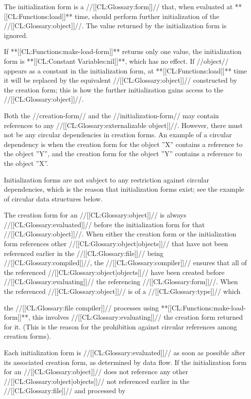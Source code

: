 The initialization form is a //[[CL:Glossary:form]]// that, when evaluated at **[[CL:Functions:load]]** time, should perform further initialization of the //[[CL:Glossary:object]]//. The value returned by the initialization form is ignored.

If **[[CL:Functions:make-load-form]]** returns only one value, the initialization form is **[[CL:Constant Variables:nil]]**, which has no effect. If //object// appears as a constant in the initialization form, at **[[CL:Functions:load]]** time it will be replaced by the equivalent //[[CL:Glossary:object]]// constructed by the creation form; this is how the further initialization gains access to the //[[CL:Glossary:object]]//.


Both the //creation-form// and the //initialization-form// may contain references to any //[[CL:Glossary:externalizable object]]//. However, there must not be any circular dependencies in creation forms. An example of a circular dependency is when the creation form for the object ''X'' contains a reference to the object ''Y'', and the creation form for the object ''Y'' contains a reference to the object ''X''.

Initialization forms are not subject to any restriction against circular dependencies, which is the reason that initialization forms exist; see the example of circular data structures below.


The creation form for an //[[CL:Glossary:object]]// is always //[[CL:Glossary:evaluated]]// before the initialization form for that //[[CL:Glossary:object]]//. When either the creation form or the initialization form references other //[[CL:Glossary:object|objects]]// that have not been referenced earlier in the //[[CL:Glossary:file]]// being //[[CL:Glossary:compiled]]//, the //[[CL:Glossary:compiler]]// ensures that all of the referenced //[[CL:Glossary:object|objects]]// have been created before //[[CL:Glossary:evaluating]]// the referencing //[[CL:Glossary:form]]//. When the referenced //[[CL:Glossary:object]]// is of a //[[CL:Glossary:type]]// which

the //[[CL:Glossary:file compiler]]// processes using **[[CL:Functions:make-load-form]]**, this involves //[[CL:Glossary:evaluating]]// the creation form returned for it. (This is the reason for the prohibition against circular references among creation forms).

Each initialization form is //[[CL:Glossary:evaluated]]// as soon as possible after its associated creation form, as determined by data flow. If the initialization form for an //[[CL:Glossary:object]]// does not reference any other //[[CL:Glossary:object|objects]]// not referenced earlier in the //[[CL:Glossary:file]]// and processed by

